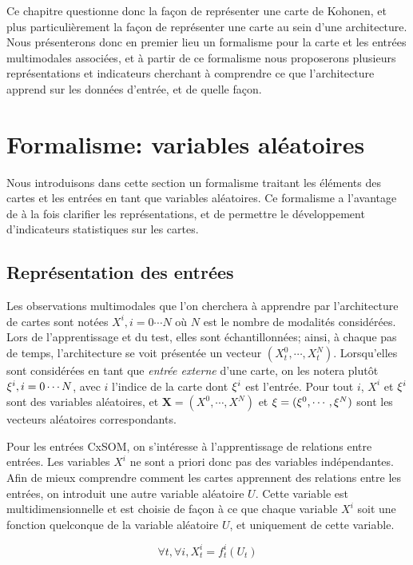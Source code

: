 Ce chapitre questionne donc la façon de représenter une carte de Kohonen, et plus particulièrement la façon de représenter une carte au sein d'une architecture. Nous présenterons donc en premier lieu un formalisme pour la carte et les entrées multimodales associées, et à partir de ce formalisme nous proposerons plusieurs représentations et indicateurs cherchant à comprendre ce que l'architecture apprend sur les données d'entrée, et de quelle façon. 

\section{Formalisme: variables aléatoires}

Nous introduisons dans cette section un formalisme traitant les éléments des cartes et les entrées en tant que variables aléatoires. Ce formalisme a l'avantage de à la fois clarifier les représentations, et de permettre le développement d'indicateurs statistiques sur les cartes.

\subsection{Représentation des entrées}

Les observations multimodales que l'on cherchera à apprendre par l'architecture de cartes sont notées ${X^i, i = 0 \cdots N}$ où $N$ est le nombre de modalités considérées. Lors de l'apprentissage et du test, elles sont échantillonnées; ainsi, à chaque pas de temps, l'architecture se voit présentée un vecteur $(X^0_t, \cdots, X^N_t)$.
Lorsqu'elles sont considérées en tant que \emph{entrée externe} d'une carte, on les notera plutôt ${\xi^i, i=0 \cdots N} $, avec $i$ l'indice de la carte dont $\xi^i$ est l'entrée.
Pour tout $i$, $X^i$ et $\xi^i$ sont des variables aléatoires, et $\mathbf{X} = (X^0, \cdots, X^N)$ et $\mathbf{\xi} = (\xi^0, \cdots , \xi^N)$ sont les vecteurs aléatoires correspondants.

Pour les entrées CxSOM, on s'intéresse à l'apprentissage de relations entre entrées. Les variables $X^i$ ne sont a priori donc pas des variables indépendantes. Afin de mieux comprendre comment les cartes apprennent des relations entre les entrées, on introduit une autre variable aléatoire $U$. Cette variable est multidimensionnelle et est choisie de façon à ce que chaque variable $X^i$ soit une fonction quelconque de la variable aléatoire $U$, et uniquement de cette variable. 

\begin{equation}
\forall t, \forall i, X^i_t = f^i_t(U_t)
\label{eq:U}
\end{equation}

